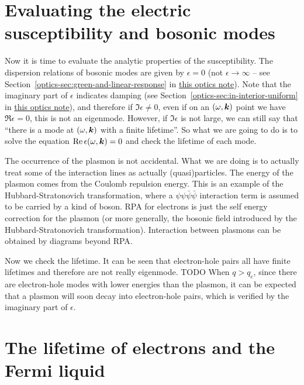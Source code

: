 \documentclass[hyperref, a4paper]{article}
\newcommand{\opticsdoc}{\href{../optics/optics.pdf}{this optics note}}
\begin{document}
\section{Evaluating the electric susceptibility and bosonic modes}\label{sec:boson-modes}

Now it is time to evaluate the analytic properties of the susceptibility. 
The dispersion relations of bosonic modes are given by $\epsilon = 0$ (not $\epsilon \to \infty$ -- see 
Section~\ref{optics-sec:green-and-linear-response} in \opticsdoc). 
Note that the imaginary part of $\epsilon$ indicates damping (see Section~\ref{optics-sec:in-interior-uniform}
in \opticsdoc), and therefore if $\Im \epsilon \neq 0$, even if on an $(\omega, \vb*{k})$ point we have 
$\Re \epsilon = 0$, this is not an eigenmode. However, if $\Im \epsilon$ is not large, we can still say 
that ``there is a mode at $(\omega, \vb*{k})$ with a finite lifetime''. So what we are going to do is 
to solve the equation $\Re \epsilon(\omega, \vb*{k}) = 0$ and check the lifetime of each mode.

\begin{note*}{}
    The occurrence of the plasmon is not accidental. What we are doing is to actually treat some of the 
    interaction lines as actually (quasi)particles. The energy of the plasmon comes from the Coulomb 
    repulsion energy. This is an example of the Hubbard-Stratonovich transformation, where a $\psi \psi 
    \bar{\psi} \bar{\psi}$ interaction term is assumed to be carried by a kind of boson. RPA for electrons 
    is just the self energy correction for the plasmon (or more generally, the bosonic field introduced 
    by the Hubbard-Stratonovich transformation). Interaction between plasmons can be obtained by diagrams 
    beyond RPA. 
\end{note*}

Now we check the lifetime. It can be seen that electron-hole pairs all have finite lifetimes and therefore 
are not really eigenmode. TODO When $q > q_\text{c}$, since there are electron-hole modes with lower energies 
than the plasmon, it can be expected that a plasmon will soon decay into electron-hole pairs, which is 
verified by the imaginary part of $\epsilon$. 

\section{The lifetime of electrons and the Fermi liquid}
\end{document}
